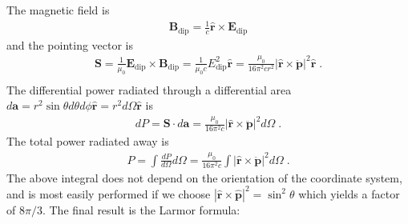 \documentclass[12pt]{article}
\renewcommand{\vec}[1]{\boldsymbol{#1}}
\newcommand{\hvec}[1]{\hat{\vec{#1}}}
\begin{document}
The magnetic field is
\begin{align}
\vec{B}_\text{dip} =  \frac{1}{c} \hvec{r} \times \vec{E}_\text{dip} 
\end{align}
and the pointing vector is
\begin{align}
\vec{S} =  \frac{1}{\mu_0} \vec{E}_\text{dip}\times\vec{B}_\text{dip} =  \frac{1}{\mu_0c} E_\text{dip}^2\hvec{r} 
= \frac{\mu_0}{16 \pi^2 cr^2} |\hvec{r} \times    \ddot{\vec{p}}|^2\hvec{r} \;.\\
\end{align}
The differential power radiated through a differential area $d\vec{a} = r^2 \sin\theta d\theta d\phi \hvec{r} = r^2 d\Omega \hvec{r}$ is
\begin{align}
dP = \vec{S}\cdot d\vec{a} = \frac{\mu_0 }{16\pi^2 c} |\hvec{r} \times    \ddot{\vec{p}}|^2 d\Omega \; .
\end{align}
The total power radiated away is
\begin{align}
P = \int \frac{dP}{d\Omega} d\Omega =  \frac{\mu_0 }{16\pi^2 c}  \int |\hvec{r} \times    \ddot{\vec{p}}|^2 d\Omega  \; .
\end{align}
The above integral does not depend on the orientation of the coordinate system, and is most easily performed if we choose $|\hvec{r} \times \hvec{p}|^2 = \sin^2\theta$ which yields a factor of $8\pi/3$.  The final result is the Larmor formula:
\end{document}
